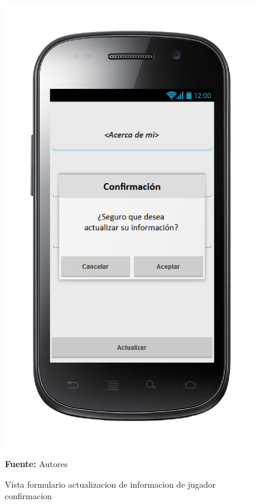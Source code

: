 \begin{figure}[!htb]
  \begin{center}
\includegraphics[width=11cm]{./imagenes/UI/Usuarios/formulario_actualizacion_de_informacion_de_jugador_confirmacion.png}
    \caption{Vista formulario actualizacion de informacion de jugador confirmacion}
    \label{fig:Vista_formulario_actualizacion_de_informacion_de_jugador_confirmacion}
    \textbf{Fuente:}  Autores
  \end{center}
\end{figure}
